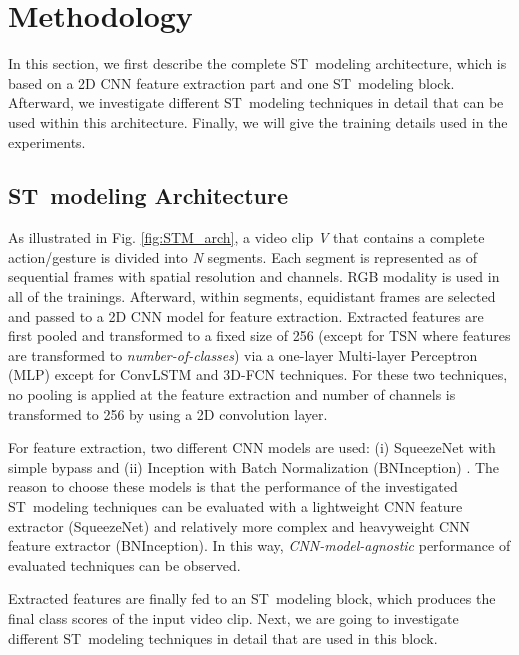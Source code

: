 \documentclass[runningheads]{llncs}
\begin{document}
 \vspace{-0.25cm}
\section{Methodology}

In this section, we first describe the complete ST~modeling architecture, which is based on a 2D CNN feature extraction part and one ST~modeling block. Afterward, we investigate different ST~modeling techniques in detail that can be used within this architecture. Finally, we will give the training details used in the experiments.

\subsection{ST~modeling Architecture}

As illustrated in Fig. \ref{fig:STM_arch}, a video clip \textit{V} that contains a complete action/gesture is divided into \textit{N} segments. Each segment is represented as  of  sequential frames with  spatial resolution and  channels. RGB modality is used in all of the trainings. Afterward, within segments, equidistant frames are selected and passed to a 2D CNN model for feature extraction. Extracted features are first pooled and transformed to a fixed size of 256 (except for TSN where features are transformed to \textit{number-of-classes}) via a one-layer Multi-layer Perceptron (MLP) except for ConvLSTM and 3D-FCN techniques. For these two techniques, no pooling is applied at the feature extraction and number of channels is transformed to 256 by using a  2D convolution layer.

For feature extraction, two different CNN models are used: (i) SqueezeNet \cite{iandola2016squeezenet} with simple bypass and (ii) Inception with Batch Normalization (BNInception) \cite{ioffe2015batch}. The reason to choose these models is that the performance of the investigated ST~modeling techniques can be evaluated with a lightweight CNN feature extractor (SqueezeNet) and relatively more complex and heavyweight CNN feature extractor (BNInception). In this way, \textit{CNN-model-agnostic} performance of evaluated techniques can be observed.  

Extracted features are finally fed to an ST~modeling block, which produces the final class scores of the input video clip. Next, we are going to investigate different ST~modeling techniques in detail that are used in this block.
\end{document}
